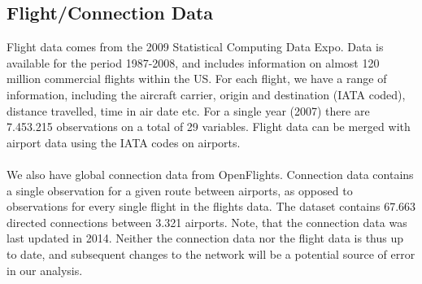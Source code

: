 \subsection{Flight/Connection Data}
\label{subsec:Flight_Data}
Flight data comes from the 2009 Statistical Computing Data Expo. Data is available for the period 1987-2008, and  includes information on almost 120 million commercial flights within the US. For each flight, we have a range of information, including the aircraft carrier, origin and destination (IATA coded), distance travelled, time in air date etc. For a single year (2007) there are 7.453.215 observations on a total of 29 variables. Flight data can be merged with airport data using the IATA codes on airports. \\
\\
We also have global connection data from OpenFlights. Connection data contains a single observation for a given route between airports, as opposed to observations for every single flight in the flights data. The dataset contains 67.663 directed connections between 3.321 airports. Note, that the connection data was last updated in 2014. Neither the connection data nor the flight data is thus up to date, and subsequent changes to the network will be a potential source of error in our analysis. 



